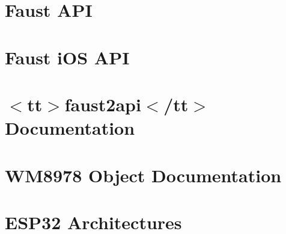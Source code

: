 \let\mypdfximage\pdfximage\def\pdfximage{\immediate\mypdfximage}\documentclass[twoside]{book}
\newcommand{\+}{\discretionary{\mbox{\scriptsize$\hookleftarrow$}}{}{}}
\begin{document}
\chapter{Faust A\+PI}
\label{md__c_1__users_fab_src__github_branches__neural_amp_modeler_plugin_i_plug2__dependencies__build_1f28fcdeb1e8a55cb53cfc592d009985}

\chapter{Faust i\+OS A\+PI}
\label{md__c_1__users_fab_src__github_branches__neural_amp_modeler_plugin_i_plug2__dependencies__build_win__faust_faust_api_doc_i_o_s}

\chapter{$<$tt$>$faust2api$<$/tt$>$ Documentation}
\label{md__c_1__users_fab_src__github_branches__neural_amp_modeler_plugin_i_plug2__dependencies__build_dc4984d85828320f4491a55db9e58576}

\chapter{W\+M8978 Object Documentation}
\label{md__c_1__users_fab_src__github_branches__neural_amp_modeler_plugin_i_plug2__dependencies__build_483a331023e6b19bf2bfd56637a2fb53}

\chapter{E\+S\+P32 Architectures}
\label{md__c_1__users_fab_src__github_branches__neural_amp_modeler_plugin_i_plug2__dependencies__build_4b023dba4576f2f898b34e7a262b1cb5}

\end{document}
